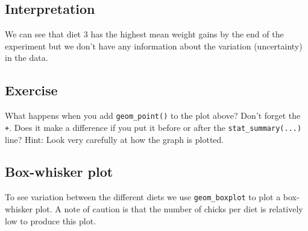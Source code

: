 \documentclass[a4paper,9pt,twocolumn,twoside,printwatermark=false]{pinp}
\begin{document}
\subsection{Interpretation}\label{interpretation-3}

We can see that diet 3 has the highest mean weight gains by the end of
the experiment but we don't have any information about the variation
(uncertainty) in the data.

\subsection{Exercise}\label{exercise-7}

What happens when you add \texttt{geom\_point()} to the plot above?
Don't forget the \texttt{+}. Does it make a difference if you put it
before or after the \texttt{stat\_summary(...)} line? Hint: Look very
carefully at how the graph is plotted.

\subsection{Box-whisker plot}\label{box-whisker-plot}

To see variation between the different diets we use
\texttt{geom\_boxplot} to plot a box-whisker plot. A note of caution is
that the number of chicks per diet is relatively low to produce this
plot.

\begin{Shaded}
\begin{Highlighting}[]
\OperatorTok{+}
\StringTok{  }\NormalTok{(}\OperatorTok{~}\OperatorTok{+}
\StringTok{  }\NormalTok{() }\OperatorTok{+}
\StringTok{  }\NormalTok{(} \NormalTok{) }\OperatorTok{+}
\StringTok{  }\NormalTok{(}\NormalTok{)}
\end{Highlighting}
\end{Shaded}
\end{document}
